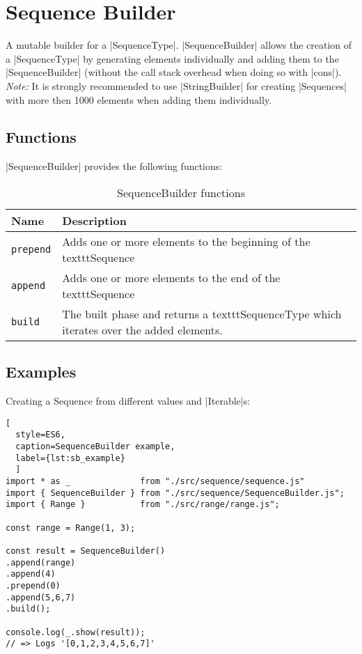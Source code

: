 \section{Sequence Builder}
\label{sec:Sequence Builder}
A mutable builder for a |SequenceType|.
\newline
|SequenceBuilder| allows the creation of a |SequenceType| by generating elements individually 
and adding them to the |SequenceBuilder| (without the call stack overhead when doing so
with |cons|).
\newline
\textit{Note:} It is strongly recommended to use |StringBuilder| for creating
|Sequences| with more then 1000 elements when adding them individually.

\subsection{Functions}
\label{sub:sb_Functions}

|SequenceBuilder| provides the following functions:

\begin{table}[H]
  \centering
  \begin{tabularx}{\textwidth}{| l | X |} \hline
    \textbf{Name}    & \textbf{Description} \\ \hline
    \texttt{prepend} & Adds one or more elements to the beginning of the texttt{Sequence}\\ \hline 
    \texttt{append}  & Adds one or more elements to the end of the texttt{Sequence} \\ \hline 
    \texttt{build}   & The built phase and returns a texttt{SequenceType} which iterates over the added elements. \\ \hline 
   \end{tabularx}
  \caption{SequenceBuilder functions}
  \label{tab:sb_functions}
\end{table}

\subsection{Examples}
\label{sub:sb_Examples}
Creating a Sequence from different values and |Iterable|s:

\begin{lstlisting}[
  style=ES6, 
  caption=SequenceBuilder example,
  label={lst:sb_example}
  ]
import * as _              from "./src/sequence/sequence.js"
import { SequenceBuilder } from "./src/sequence/SequenceBuilder.js";
import { Range }           from "./src/range/range.js";

const range = Range(1, 3);

const result = SequenceBuilder()
.append(range)
.append(4)
.prepend(0)
.append(5,6,7)
.build();

console.log(_.show(result));
// => Logs '[0,1,2,3,4,5,6,7]'
\end{lstlisting}
